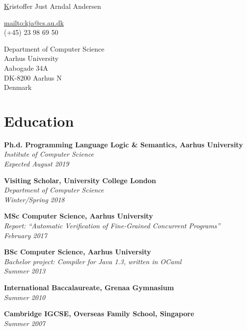 \documentclass[10pt,letterpaper]{article}
\def\name{Kristoffer Just Arndal Andersen}
\renewenvironment{itemize}{
  \begin{list}{}{
    \setlength{\leftmargin}{1.5em}
    \setlength{\itemsep}{0.25em}
    \setlength{\parskip}{0pt}
    \setlength{\parsep}{0.25em}
  }
}{
  \end{list}
}
\begin{document}


\begin{minipage}[b]{0.7\textwidth}
  {\huge\underline \name}

  \bigskip
  \bigskip
  \bigskip

  \url{mailto:kja@cs.au.dk}\\
  (+45) 23 98 69 50

\bigskip
  Department of Computer Science\\
  Aarhus University\\
  Aabogade 34A\\
  DK-8200 Aarhus N\\
  Denmark
  \end{minipage}


\section*{Education}

\begin{itemize}
  \item{\bfseries Ph.d. Programming Language Logic \& Semantics, Aarhus
      University}\\
    \emph{Institute of Computer Science}\\
    \emph{Expected August 2019}
  \item {\bfseries Visiting Scholar, University College London}\\
  \emph{Department of Computer Science}\\
  \emph{Winter/Spring 2018}
  \item {\bfseries MSc Computer Science, Aarhus University} \\
    \emph{Report: ``Automatic Verification of Fine-Grained Concurrent Programs''} \\
    \emph{February 2017}
  \item {\bfseries BSc Computer Science, Aarhus University} \\
    \emph{Bachelor project: Compiler for Java 1.3, written in OCaml}\\
    \emph{Summer 2013}
  \item {\bfseries International Baccalaureate, Grenaa Gymnasium} \\
    \emph{Summer 2010}
  \item{\bfseries Cambridge IGCSE, Overseas Family School, Singapore}\\
    \emph{Summer 2007}
\end{itemize}
\end{document}

